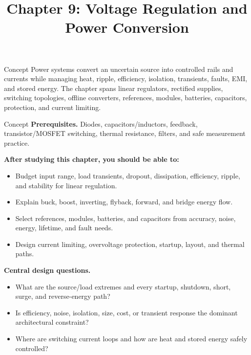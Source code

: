 \documentclass[10pt,letterpaper]{article}
\title{Chapter 9: Voltage Regulation and Power Conversion}
\author{}
\date{}
\begin{document}
\maketitle

\begin{CornellOverviewBox}{Concept}
Power systems convert an uncertain source into controlled rails and currents while managing heat, ripple, efficiency, isolation, transients, faults, EMI, and stored energy. The chapter spans linear regulators, rectified supplies, switching topologies, offline converters, references, modules, batteries, capacitors, protection, and current limiting.
\end{CornellOverviewBox}
\begin{CornellOverviewBox}{Concept}
\textbf{Prerequisites.} Diodes, capacitors/inductors, feedback, transistor/MOSFET switching, thermal resistance, filters, and safe measurement practice.

\textbf{After studying this chapter, you should be able to:}
\begin{itemize}
  \item Budget input range, load transients, dropout, dissipation, efficiency, ripple, and stability for linear regulation.
  \item Explain buck, boost, inverting, flyback, forward, and bridge energy flow.
  \item Select references, modules, batteries, and capacitors from accuracy, noise, energy, lifetime, and fault needs.
  \item Design current limiting, overvoltage protection, startup, layout, and thermal paths.
\end{itemize}\textbf{Central design questions.}
\begin{itemize}
  \item What are the source/load extremes and every startup, shutdown, short, surge, and reverse-energy path?
  \item Is efficiency, noise, isolation, size, cost, or transient response the dominant architectural constraint?
  \item Where are switching current loops and how are heat and stored energy safely controlled?
\end{itemize}\end{CornellOverviewBox}
\end{document}
